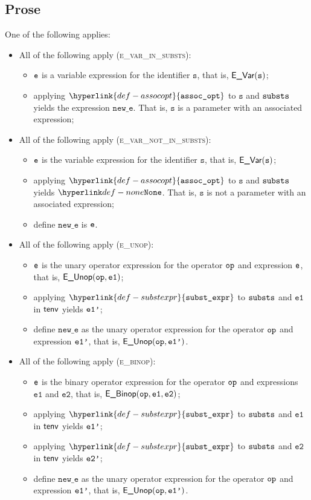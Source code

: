 \documentclass{book}
\newcommand\assocopt[0]{\hyperlink{def-assocopt}{\texttt{assoc\_opt}}}
\newcommand\substexpr[0]{\hyperlink{def-substexpr}{\texttt{subst\_expr}}}
\newcommand\veone[0]{\texttt{e1}}
\newcommand\vetwo[0]{\texttt{e2}}
\newcommand\vs[0]{\texttt{s}}
\newcommand\newe[0]{\texttt{new\_e}}
\begin{document}
\subsection{Prose}
One of the following applies:
\begin{itemize}
  \item All of the following apply (\textsc{e\_var\_in\_substs}):
  \begin{itemize}
    \item $\texttt{e}$ is a variable expression for the identifier $\vs$, that is, $\EVar(\vs)$;
    \item applying $\assocopt$ to $\vs$ and $\texttt{substs}$ yields the expression $\newe$.
          That is, $\vs$ is a parameter with an associated expression;
  \end{itemize}

  \item All of the following apply (\textsc{e\_var\_not\_in\_substs}):
  \begin{itemize}
    \item $\texttt{e}$ is the variable expression for the identifier $\vs$, that is, $\EVar(\vs)$;
    \item applying $\assocopt$ to $\vs$ and $\texttt{substs}$ yields $\None$.
          That is, $\vs$ is not a parameter with an associated expression;
    \item define $\newe$ is $\texttt{e}$.
  \end{itemize}

  \item All of the following apply (\textsc{e\_unop}):
  \begin{itemize}
    \item $\texttt{e}$ is the unary operator expression for the operator $\texttt{op}$ and expression $\texttt{e}$, that is, $\EUnop(\op, \veone)$;
    \item applying $\substexpr$ to $\texttt{substs}$ and $\veone$ in $\textsf{tenv}$ yields $\texttt{e1'}$;
    \item define $\newe$ as the unary operator expression for the operator $\texttt{op}$ and expression $\texttt{e1'}$, that is, $\textsf{E\_Unop}(\texttt{op}, \texttt{e1'})$.
  \end{itemize}

  \item All of the following apply (\textsc{e\_binop}):
  \begin{itemize}
    \item $\texttt{e}$ is the binary operator expression for the operator $\texttt{op}$ and expressions $\veone$ and $\vetwo$, that is, $\EBinop(\op, \veone, \vetwo)$;
    \item applying $\substexpr$ to $\texttt{substs}$ and $\veone$ in $\textsf{tenv}$ yields $\texttt{e1'}$;
    \item applying $\substexpr$ to $\texttt{substs}$ and $\vetwo$ in $\textsf{tenv}$ yields $\texttt{e2'}$;
    \item define $\newe$ as the unary operator expression for the operator $\texttt{op}$ and expression $\texttt{e1'}$, that is, $\textsf{E\_Unop}(\texttt{op}, \texttt{e1'})$.
  \end{itemize}


\end{itemize}
\end{document}
